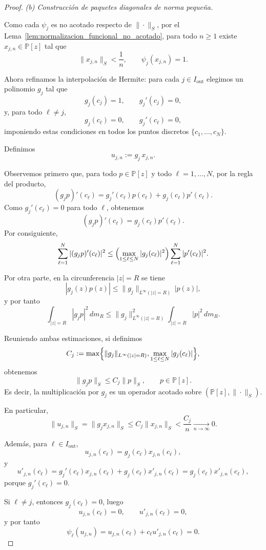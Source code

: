 \documentclass[12pt,a4paper]{article}
\theoremstyle{definition}
\theoremstyle{remark}
\begin{document}
\begin{proof}
	\smallskip
	\noindent
	\emph{(b) Construcción de paquetes diagonales de norma pequeña.}

	Como cada $\psi_j$ es no acotado respecto de $\|\cdot\|_S$, por el
	Lema~\ref{lem:normalizacion_funcional_no_acotado}, para todo $n\ge1$
	existe $x_{j,n}\in \mathbb P[z]$ tal que
	\[
		\|x_{j,n}\|_S<\frac1n,
		\qquad
		\psi_j(x_{j,n})=1.
	\]

	Ahora refinamos la interpolación de Hermite: para cada $j\in I_{\mathrm{out}}$ elegimos
	un polinomio $g_j$ tal que
	\[
		g_j(c_j)=1,\qquad g_j'(c_j)=0,
	\]
	y, para todo $\ell\neq j$,
	\[
		g_j(c_\ell)=0,\qquad g_j'(c_\ell)=0,
	\]
	imponiendo estas condiciones en todos los puntos discretos
	$\{c_1,\dots,c_N\}$.

	Definimos
	\[
		u_{j,n}:=g_j\,x_{j,n}.
	\]

	Observemos primero que, para todo $p\in\mathbb P[z]$ y todo $\ell=1,\dots,N$,
	por la regla del producto,
	\[
		(g_jp)'(c_\ell)
		=
		g_j'(c_\ell)p(c_\ell)+g_j(c_\ell)p'(c_\ell).
	\]
	Como $g_j'(c_\ell)=0$ para todo $\ell$, obtenemos
	\[
		(g_jp)'(c_\ell)=g_j(c_\ell)p'(c_\ell).
	\]
	Por consiguiente,
	\[
		\sum_{\ell=1}^N |(g_jp)'(c_\ell)|^2
		\le
		\Bigl(\max_{1\le \ell\le N}|g_j(c_\ell)|^2\Bigr)
		\sum_{\ell=1}^N |p'(c_\ell)|^2.
	\]

	Por otra parte, en la circunferencia $|z|=R$ se tiene
	\[
		|g_j(z)p(z)|
		\le
		\|g_j\|_{L^\infty(|z|=R)}\,|p(z)|,
	\]
	y por tanto
	\[
		\int_{|z|=R}|g_jp|^2\,dm_R
		\le
		\|g_j\|_{L^\infty(|z|=R)}^2
		\int_{|z|=R}|p|^2\,dm_R.
	\]

	Reuniendo ambas estimaciones, si definimos
	\[
		C_j:=
		\max\Bigl\{
		\|g_j\|_{L^\infty(|z|=R)},
		\max_{1\le \ell\le N}|g_j(c_\ell)|
		\Bigr\},
	\]
	obtenemos
	\[
		\|g_jp\|_S\le C_j\|p\|_S,
		\qquad p\in\mathbb P[z].
	\]
	Es decir, la multiplicación por $g_j$ es un operador acotado sobre
	$(\mathbb P[z],\|\cdot\|_S)$.

	En particular,
	\[
		\|u_{j,n}\|_S=\|g_jx_{j,n}\|_S\le C_j\|x_{j,n}\|_S<\frac{C_j}{n}\xrightarrow[n\to\infty]{}0.
	\]

	Además, para $\ell\in I_{\mathrm{out}}$,
	\[
		u_{j,n}(c_\ell)=g_j(c_\ell)x_{j,n}(c_\ell),
	\]
	y
	\[
		u'_{j,n}(c_\ell)=g_j'(c_\ell)x_{j,n}(c_\ell)+g_j(c_\ell)x'_{j,n}(c_\ell)
		=g_j(c_\ell)x'_{j,n}(c_\ell),
	\]
	porque $g_j'(c_\ell)=0$.

	Si $\ell\neq j$, entonces $g_j(c_\ell)=0$, luego
	\[
		u_{j,n}(c_\ell)=0,
		\qquad
		u'_{j,n}(c_\ell)=0,
	\]
	y por tanto
	\[
		\psi_\ell(u_{j,n})=u_{j,n}(c_\ell)+c_\ell u'_{j,n}(c_\ell)=0.
	\]


\end{proof}
\end{document}

